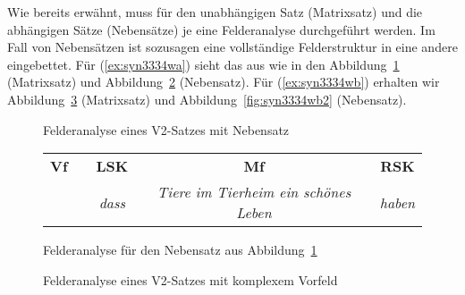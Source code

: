 \begin{exe}
  \ex\label{ex:saetze1426}
  \begin{xlist}
  \end{xlist}
\end{exe}

Wie bereits erwähnt, muss für den unabhängigen Satz (Matrixsatz) und die abhängigen Sätze (Nebensätze) je eine Felderanalyse durchgeführt werden.
Im Fall von Nebensätzen ist sozusagen eine vollständige Felderstruktur in eine andere eingebettet.
Für (\ref{ex:syn3334wa}) sieht das aus wie in den Abbildung~\ref{fig:syn3334wa1} (Matrixsatz) und Abbildung~\ref{fig:syn3334wa2} (Nebensatz).
Für (\ref{ex:syn3334wb}) erhalten wir Abbildung~\ref{fig:syn3334wb1} (Matrixsatz) und Abbildung~\ref{fig:syn3334wb2} (Nebensatz).

\Enl[2]

\begin{figure}[!htbp]
  \centering
  \caption{Felderanalyse eines V2-Satzes mit Nebensatz}
  \label{fig:syn3334wa1}
\end{figure}

\begin{figure}[!htbp]
  \centering
  \begin{tabular}{cp{0.1em}cp{0.1em}cp{0.1em}c}
    \textbf{Vf} && \textbf{LSK} && \textbf{Mf} && \textbf{RSK} \\
    \cmidrule{1-1}\cmidrule{3-3}\cmidrule{5-5}\cmidrule{7-7}
    && \textit{dass} && \textit{Tiere im Tierheim ein schönes Leben} && \textit{haben} \\
  \end{tabular}
  \caption{Felderanalyse für den Nebensatz aus Abbildung~\ref{fig:syn3334wa1}}
  \label{fig:syn3334wa2}
\end{figure}

\begin{figure}[!htbp]
  \centering
  \caption{Felderanalyse eines V2-Satzes mit komplexem Vorfeld}
  \label{fig:syn3334wb1}
\end{figure}

